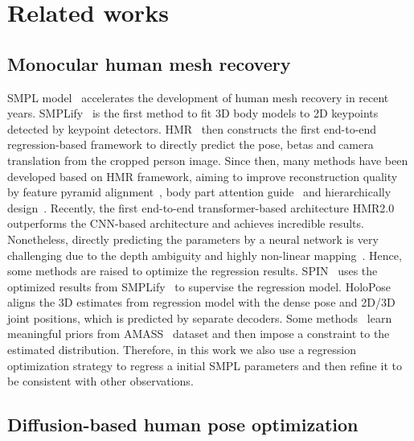 \section{Related works}

\subsection{Monocular human mesh recovery}

SMPL model~\cite{SMPL} accelerates the development of human mesh recovery in recent years. SMPLify~\cite{SMPLify} is the first method to fit 3D body models to 2D keypoints detected by  keypoint detectors. HMR~\cite{HMR} then constructs the first end-to-end regression-based framework to directly predict the pose, betas and camera translation from the cropped person image. Since then, many methods have been developed based on HMR framework, aiming to improve reconstruction quality by feature pyramid alignment~\cite{PyMAF}, body part attention guide~\cite{PARE} and hierarchically design~\cite{HKHMR}. Recently, the first end-to-end transformer-based architecture HMR2.0~\cite{HMR2.0} outperforms the CNN-based architecture and achieves incredible results. Nonetheless, directly predicting the parameters by a neural network is very challenging due to the depth ambiguity and highly non-linear mapping~\cite{zhang2020object,huang2022object,huang2022pose2uv}. Hence, some methods are raised to optimize the regression results. SPIN~\cite{SPIN} uses the optimized results from SMPLify~\cite{SMPLify} to supervise the regression model. HoloPose~\cite{HoloPose} aligns the 3D estimates from regression model with the dense pose and 2D/3D joint positions, which is predicted by separate decoders. Some methods~\cite{HuMoR,TokenHMR} learn meaningful priors from AMASS~\cite{AMASS} dataset and then impose a constraint to the estimated distribution. Therefore, in this work we also use a regression optimization strategy to regress a initial SMPL parameters and then refine it to be consistent with other observations. 


\subsection{Diffusion-based human pose optimization}

